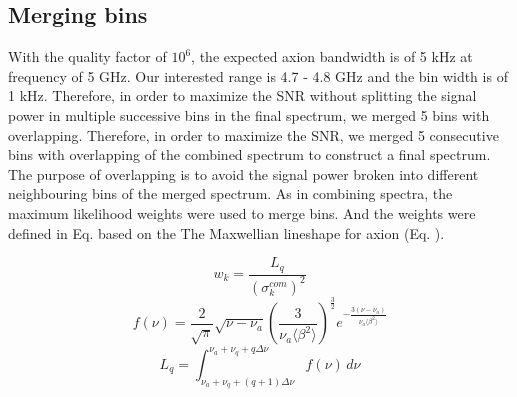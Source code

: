 
\subsection{Merging bins}

With the quality factor of $10^6$, the expected axion bandwidth is of 5 kHz at frequency of 5 GHz. Our interested range is 4.7 - 4.8 GHz and the bin width is of 1 kHz. Therefore, in order to maximize the SNR without splitting the signal power in multiple successive bins in the final spectrum, we merged 5 bins with overlapping.
Therefore, in order to maximize the SNR, we merged 5 consecutive bins with overlapping of the combined spectrum to construct a final spectrum. The purpose of overlapping is to avoid the signal power broken into different neighbouring bins of the merged spectrum.
As in combining spectra, the maximum likelihood weights were used to merge bins. And the weights were defined in Eq. \cite{eq:merge_weight} based on the The Maxwellian lineshape for axion (Eq. \cite{}).


\begin{equation}
    \label{eq:merge_weight}
    w_{k} = \frac{L_{q}}{(\sigma_{k}^{com})^{2}}
\end{equation}
\begin{equation}
    \label{eq:axion_line_shape}
    f(\nu) = \frac{2}{\sqrt{\pi}}\sqrt{\nu - \nu_a} \left( \frac{3}{\nu_a \big \langle \beta^{2} \big \rangle }\right)^{\frac{3}{2}} e^{- \frac{3(\nu-\nu_a)}{\nu_a \big \langle \beta^{2} \big \rangle}}
\end{equation}
\begin{equation}
    \label{eq:L_q_integtal}
    L_{q} = \int_{\nu_a +\nu_q + (q+1)\Delta\nu}^{\nu_a +\nu_q + q\Delta\nu} f(\nu) \,d\nu
\end{equation}

